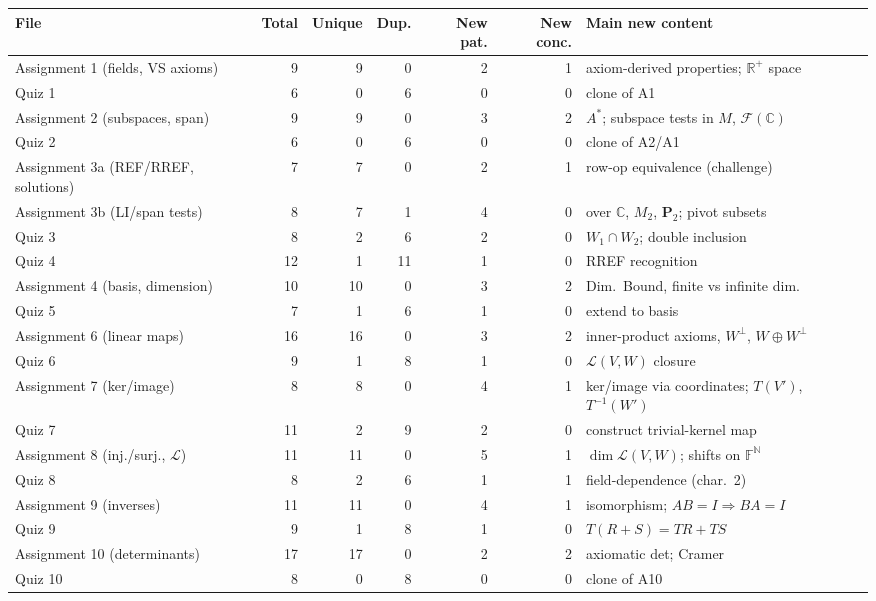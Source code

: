 \documentclass[9pt]{article}
\begin{document}
{\footnotesize
\begin{longtable}{@{}p{4.1cm}rrrrr p{6.3cm}@{}}
\toprule
\textbf{File} & \textbf{Total} & \textbf{Unique} & \textbf{Dup.} & \textbf{New pat.} & \textbf{New conc.} & \textbf{Main new content}\\\midrule\endhead
Assignment 1 (fields, VS axioms) & 9 & 9 & 0 & 2 & 1 & axiom-derived properties; $\mathbb R^+$ space\\
Quiz 1 & 6 & 0 & 6 & 0 & 0 & clone of A1\\
Assignment 2 (subspaces, span) & 9 & 9 & 0 & 3 & 2 & $A^*$; subspace tests in $M$, $\mathcal F(\mathbb C)$\\
Quiz 2 & 6 & 0 & 6 & 0 & 0 & clone of A2/A1\\
Assignment 3a (REF/RREF, solutions) & 7 & 7 & 0 & 2 & 1 & row-op equivalence (challenge)\\
Assignment 3b (LI/span tests) & 8 & 7 & 1 & 4 & 0 & over $\mathbb C$, $M_2$, $\mathbf P_2$; pivot subsets\\
Quiz 3 & 8 & 2 & 6 & 2 & 0 & $W_1\cap W_2$; double inclusion\\
Quiz 4 & 12 & 1 & 11 & 1 & 0 & RREF recognition\\
Assignment 4 (basis, dimension) & 10 & 10 & 0 & 3 & 2 & Dim.\ Bound, finite vs infinite dim.\\
Quiz 5 & 7 & 1 & 6 & 1 & 0 & extend to basis\\
Assignment 6 (linear maps) & 16 & 16 & 0 & 3 & 2 & inner-product axioms, $W^\perp$, $W\oplus W^\perp$\\
Quiz 6 & 9 & 1 & 8 & 1 & 0 & $\mathcal L(V,W)$ closure\\
Assignment 7 (ker/image) & 8 & 8 & 0 & 4 & 1 & ker/image via coordinates; $T(V')$, $T^{-1}(W')$\\
Quiz 7 & 11 & 2 & 9 & 2 & 0 & construct trivial-kernel map\\
Assignment 8 (inj./surj., $\mathcal L$) & 11 & 11 & 0 & 5 & 1 & $\dim\mathcal L(V,W)$; shifts on $\mathbb F^{\mathbb N}$\\
Quiz 8 & 8 & 2 & 6 & 1 & 1 & field-dependence (char.\ 2)\\
Assignment 9 (inverses) & 11 & 11 & 0 & 4 & 1 & isomorphism; $AB{=}I\Rightarrow BA{=}I$\\
Quiz 9 & 9 & 1 & 8 & 1 & 0 & $T(R{+}S)=TR+TS$\\
Assignment 10 (determinants) & 17 & 17 & 0 & 2 & 2 & axiomatic det; Cramer\\
Quiz 10 & 8 & 0 & 8 & 0 & 0 & clone of A10\\

\end{longtable}}
\end{document}
